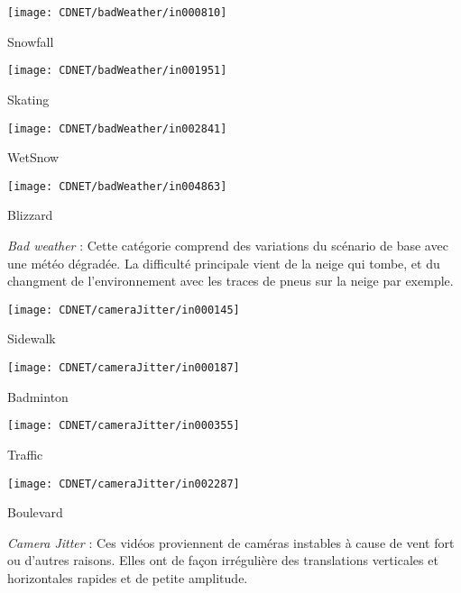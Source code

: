 	\begin{figureth}
		\begin{subfigureth}{0.24\textwidth}
			\texttt{[image: CDNET/badWeather/in000810]}\caption{Snowfall}	
		\end{subfigureth}
		\begin{subfigureth}{0.24\textwidth}
			\texttt{[image: CDNET/badWeather/in001951]}\caption{Skating}	
		\end{subfigureth}
		\begin{subfigureth}{0.24\textwidth}
			\texttt{[image: CDNET/badWeather/in002841]}\caption{WetSnow}	
		\end{subfigureth}
		\begin{subfigureth}{0.24\textwidth}
			\texttt{[image: CDNET/badWeather/in004863]}\caption{Blizzard}	
		\end{subfigureth}
		\caption[Catégorie Bad weather]{\textit{Bad weather} : Cette catégorie comprend des variations du scénario de base avec une météo dégradée. La difficulté principale vient de la neige qui tombe, et du changment de l'environnement avec les traces de pneus sur la neige par exemple.}\label{fig:cdnet:badweather}
	\end{figureth}

	\begin{figureth}
		\begin{subfigureth}{0.24\textwidth}
			\texttt{[image: CDNET/cameraJitter/in000145]}\caption{Sidewalk}	
		\end{subfigureth}
		\begin{subfigureth}{0.24\textwidth}
			\texttt{[image: CDNET/cameraJitter/in000187]}\caption{Badminton}	
		\end{subfigureth}
		\begin{subfigureth}{0.24\textwidth}
			\texttt{[image: CDNET/cameraJitter/in000355]}\caption{Traffic}	
		\end{subfigureth}
		\begin{subfigureth}{0.24\textwidth}
			\texttt{[image: CDNET/cameraJitter/in002287]}\caption{Boulevard}	
		\end{subfigureth}
		\caption[categorie camera jitter]{\textit{Camera Jitter} : Ces vidéos proviennent de caméras instables à cause de vent fort ou d'autres raisons. Elles ont de façon irrégulière des translations verticales et horizontales  rapides et de petite amplitude.}\label{fig:cdnet:jitter}
	\end{figureth}

